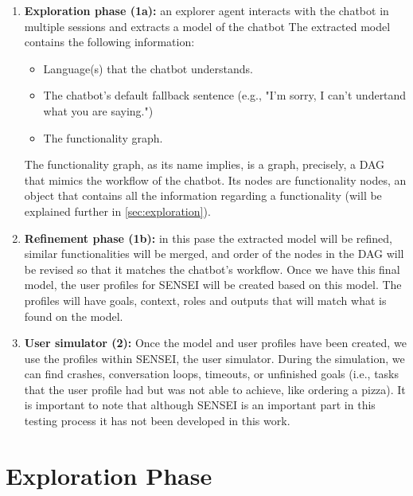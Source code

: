 \begin{enumerate}
  \item \textbf{Exploration phase (1a):}
    an explorer agent interacts with the chatbot in multiple sessions
    and extracts a model of the chatbot
    The extracted model contains the following information:
    \begin{itemize}
      \item Language(s) that the chatbot understands.
      \item The chatbot's default fallback sentence (e.g., "I'm sorry, I can't undertand what you are saying.")
      \item The functionality graph.
    \end{itemize}

    The functionality graph, as its name implies,
    is a graph, precisely, a \ac{DAG}
    that mimics the workflow of the chatbot.
    Its nodes are functionality nodes,
    an object that contains all the information regarding a functionality
    (will be explained further in 
    \autoref{sec:exploration}).

  \item \textbf{Refinement phase (1b):}
    in this pase the extracted model will be refined,
    similar functionalities will be merged,
    and order of the nodes in the \ac{DAG} will be revised
    so that it matches the chatbot's workflow.
    Once we have this final model,
    the user profiles for SENSEI will be created based on this model.
    The profiles will have goals, context, roles and outputs
    that will match what is found on the model.

  \item \textbf{User simulator (2):}
    Once the model and user profiles have been created,
    we use the profiles within SENSEI, the user simulator.
    During the simulation,
    we can find crashes, conversation loops, timeouts,
    or unfinished goals (i.e., tasks that the user profile had
    but was not able to achieve, like ordering a pizza).
    It is important to note that
    although SENSEI is an important part in this testing process
    it has not been developed in this work.
\end{enumerate}



\section{Exploration Phase}\label{sec:exploration}

